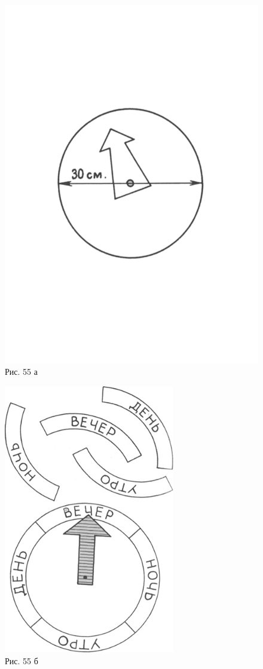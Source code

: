 \documentclass[a5paper]{book}
\begin{document}
\begin{figure}
\includegraphics[width=\linewidth]{media/media/image51.png}
\caption{Рис. 55 а}
\end{figure}
\begin{figure}
\includegraphics[width=2.93903in,height=4.64122in]{media/media/image52.jpg}
\caption{Рис. 55 б}
\end{figure}
\end{document}
